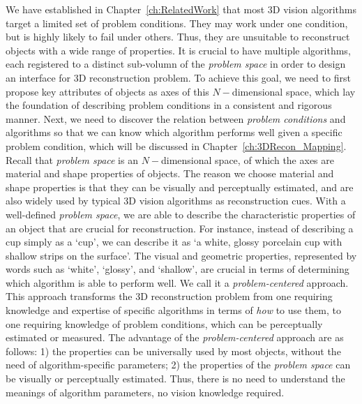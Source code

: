 We have established in Chapter~\ref{ch:RelatedWork} that most 3D vision algorithms target a limited set of problem conditions. They may work under one condition, but is highly likely to fail under others. Thus, they are unsuitable to reconstruct objects with a wide range of properties. It is crucial to have multiple algorithms, each registered to a distinct sub-volumn of the \textit{problem space} in order to design an interface for 3D reconstruction problem. To achieve this goal, we need to first propose key attributes of objects as axes of this $N-$dimensional space, which lay the foundation of describing problem conditions in a consistent and rigorous manner. Next, we need to discover the relation between \textit{problem conditions} and algorithms so that we can know which algorithm performs well given a specific problem condition, which will be discussed in Chapter~\ref{ch:3DRecon_Mapping}. Recall that \textit{problem space} is an $N-$dimensional space, of which the axes are material and shape properties of objects. The reason we choose material and shape properties is that they can be visually and perceptually estimated, and are also widely used by typical 3D vision algorithms as reconstruction cues. With a well-defined \textit{problem space}, we are able to describe the characteristic properties of an object that are crucial for reconstruction. For instance, instead of describing a cup simply as a `cup', we can describe it as `a white, glossy porcelain cup with shallow strips on the surface'. The visual and geometric properties, represented by words such as `white', `glossy', and `shallow', are crucial in terms of determining which algorithm is able to perform well. We call it a \textit{problem-centered} approach. This approach transforms the 3D reconstruction problem from one requiring knowledge and expertise of specific algorithms in terms of \textit{how} to use them, to one requiring knowledge of problem conditions, which can be perceptually estimated or measured. The advantage of the \textit{problem-centered} approach are as follows: 1) the properties can be universally used by most objects, without the need of algorithm-specific parameters; 2) the properties of the \textit{problem space} can be visually or perceptually estimated. Thus, there is no need to understand the meanings of algorithm parameters, \ie no vision knowledge required.


